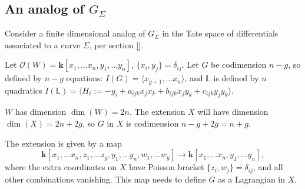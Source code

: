     
    
    
    
    
    

    
    \subsection{An analog of \texorpdfstring{\( G_\Sigma\)}{G_Sigma}}
    \label{subsec:gdimG}
    
    
    Consider a finite dimensional analog of 
    \(G_\Sigma\) in the Tate space of differentials associated to a curve \( \Sigma\), per section \ref{}. 
    
    \begin{ex}
    Let \( \mathcal{O}(W) = \mathbf{k}[x_1, \dots x_n, y_1, \dots y_n]\), \( \{x_i,y_j\}=\delta_{ij}\).
    Let \(G\) be codimension \(n-g\), so defined by \(n-g\) equations:
    \(I(G) = \langle x_{g+1}, \dots x_n  \rangle\), and 
    \( \mathbb{L}\) is defined by \(n\) quadratics 
    \( I(\mathbb{L}) =  \langle H_i := -y_i + a_{ijk}x_jx_k + b_{ijk}x_jy_k+c_{ijk}y_jy_k \rangle \). 
    \end{ex}
    \(W\) has dimension \(\dim(W)=2n\). The extension \(X\) will have dimension \(\dim(X)=2n+2g\), so \(G\) in \(X\) is codimension \(n-g+2g=n+g\).
    
    The extension is given by a map
    \[\mathbf{k}[x_1, \dots x_n,z_1, \dots z_g, y_1, \dots y_n,w_1,\dots w_g]\rightarrow \mathbf{k}[x_1, \dots x_n ,y_1, \dots y_n], \]
    where the extra coordinates on \(X\) have Poisson bracket \( \{z_i,w_j\}= \delta_{ij}\), and all other combinations vanishing. This map needs to define \(G\) as a Lagrangian in \(X\).
    
